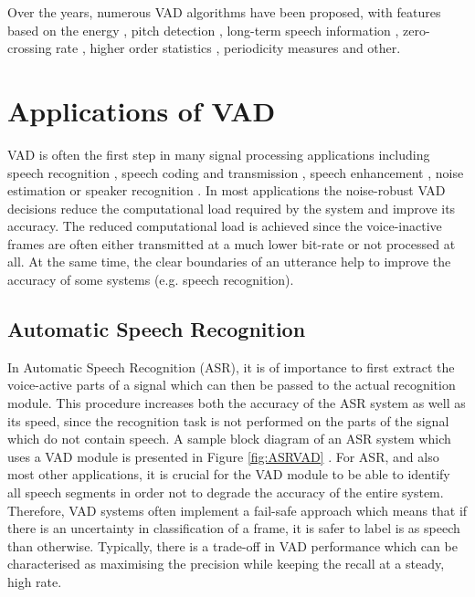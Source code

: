 Over the years, numerous VAD algorithms have been proposed, with features based on the energy \cite{G729, AMR}, pitch detection \cite{PARADE}, long-term speech information \citep{LTSD}, zero-crossing rate \cite{G729Original}, higher order statistics \cite{HOS}, periodicity measures \cite{periodicity} and other.


\section{Applications of VAD}

VAD is often the first step in many signal processing applications including speech recognition \cite{RamirezGorriz, Kuroiwa, Martin, Shafran, ImprovedLikelihood, LTSD}, speech coding and transmission \cite{Sohn, RamirezGorriz, Prasad, G729, GSMControl}, speech enhancement \cite{Park, RamirezGorriz, Borisagar}, noise estimation \cite{RamirezGorriz} or speaker recognition \cite{Sahidullah}. In most applications the noise-robust VAD decisions reduce the computational load required by the system and improve its accuracy. The reduced computational load is achieved since the voice-inactive frames are often either transmitted at a much lower bit-rate or not processed at all. At the same time, the clear boundaries of an utterance help to improve the accuracy of some systems (e.g. speech recognition).

\subsection{Automatic Speech Recognition}

In Automatic Speech Recognition (ASR), it is of importance to first extract the voice-active parts of a signal which can then be passed to the actual recognition module. This procedure increases both the accuracy of the ASR system as well as its speed, since the recognition task is not performed on the parts of the signal which do not contain speech. A sample block diagram of an ASR system which uses a VAD module is presented in Figure \ref{fig:ASRVAD} \cite{RamirezGorriz}. For ASR, and also most other applications, it is crucial for the VAD module to be able to identify all speech segments in order not to degrade the accuracy of the entire system. Therefore, VAD systems often implement a fail-safe approach which means that if there is an uncertainty in classification of a frame, it is safer to label is as speech than otherwise. Typically, there is a trade-off in VAD performance which can be characterised as maximising the precision while keeping the recall at a steady, high rate. \bigskip

